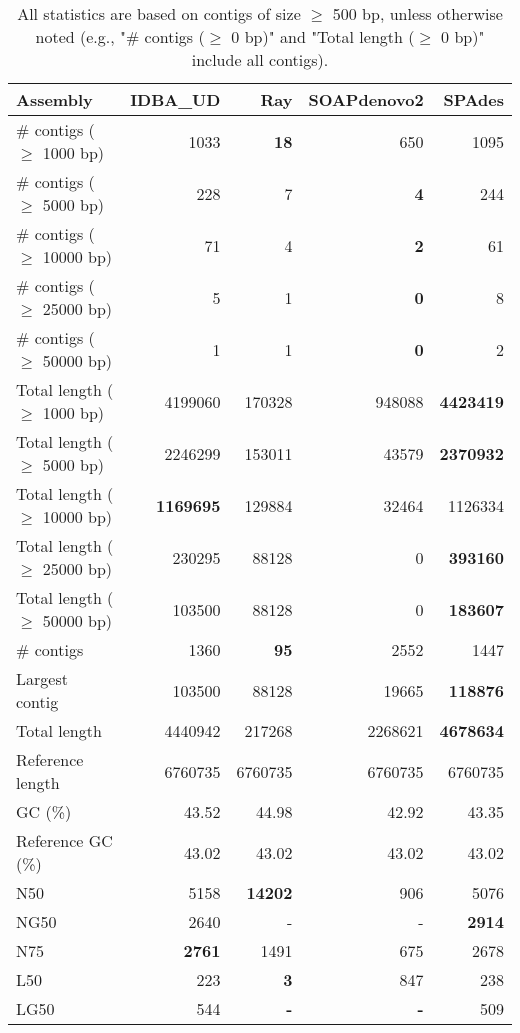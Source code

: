 \documentclass[12pt,a4paper]{article}
\begin{document}
\begin{table}[ht]
\begin{center}
\caption{All statistics are based on contigs of size $\geq$ 500 bp, unless otherwise noted (e.g., "\# contigs ($\geq$ 0 bp)" and "Total length ($\geq$ 0 bp)" include all contigs).}
\begin{tabular}{|l*{4}{|r}|}
\hline
Assembly & IDBA\_UD & Ray & SOAPdenovo2 & SPAdes \\ \hline
\# contigs ($\geq$ 1000 bp) & 1033 & {\bf 18} & 650 & 1095 \\ \hline
\# contigs ($\geq$ 5000 bp) & 228 & 7 & {\bf 4} & 244 \\ \hline
\# contigs ($\geq$ 10000 bp) & 71 & 4 & {\bf 2} & 61 \\ \hline
\# contigs ($\geq$ 25000 bp) & 5 & 1 & {\bf 0} & 8 \\ \hline
\# contigs ($\geq$ 50000 bp) & 1 & 1 & {\bf 0} & 2 \\ \hline
Total length ($\geq$ 1000 bp) & 4199060 & 170328 & 948088 & {\bf 4423419} \\ \hline
Total length ($\geq$ 5000 bp) & 2246299 & 153011 & 43579 & {\bf 2370932} \\ \hline
Total length ($\geq$ 10000 bp) & {\bf 1169695} & 129884 & 32464 & 1126334 \\ \hline
Total length ($\geq$ 25000 bp) & 230295 & 88128 & 0 & {\bf 393160} \\ \hline
Total length ($\geq$ 50000 bp) & 103500 & 88128 & 0 & {\bf 183607} \\ \hline
\# contigs & 1360 & {\bf 95} & 2552 & 1447 \\ \hline
Largest contig & 103500 & 88128 & 19665 & {\bf 118876} \\ \hline
Total length & 4440942 & 217268 & 2268621 & {\bf 4678634} \\ \hline
Reference length & 6760735 & 6760735 & 6760735 & 6760735 \\ \hline
GC (\%) & 43.52 & 44.98 & 42.92 & 43.35 \\ \hline
Reference GC (\%) & 43.02 & 43.02 & 43.02 & 43.02 \\ \hline
N50 & 5158 & {\bf 14202} & 906 & 5076 \\ \hline
NG50 & 2640 & - & - & {\bf 2914} \\ \hline
N75 & {\bf 2761} & 1491 & 675 & 2678 \\ \hline
L50 & 223 & {\bf 3} & 847 & 238 \\ \hline
LG50 & 544 & {\bf -} & {\bf -} & 509 \\ \hline

\end{tabular}
\end{center}
\end{table}
\end{document}

